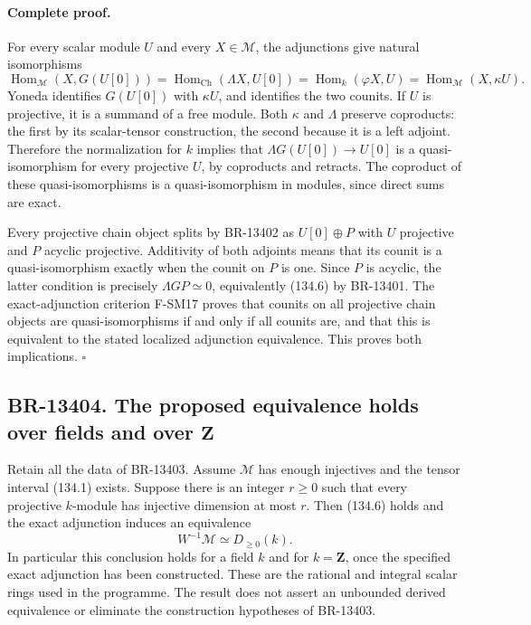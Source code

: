 \documentclass[11pt,a4paper]{article}
\theoremstyle{definition}\newtheorem{definition}[theorem]{Definition}
\theoremstyle{remark}\newtheorem{remark}[theorem]{Remark}
\begin{document}
\paragraph{Complete proof.}
For every scalar module \(U\) and every \(X\in\mathcal M\),
the adjunctions give natural isomorphisms
\[
 \operatorname{Hom}_{\mathcal M}(X,G(U[0]))
 =\operatorname{Hom}_{\mathrm{Ch}}(\Lambda X,U[0])
 =\operatorname{Hom}_k(\varphi X,U)
 =\operatorname{Hom}_{\mathcal M}(X,\kappa U).
\]
Yoneda identifies \(G(U[0])\) with \(\kappa U\), and identifies
the two counits.  If \(U\) is projective, it is a summand of a free
module.  Both \(\kappa\) and \(\Lambda\) preserve coproducts:
the first by its scalar-tensor construction, the second because it is
a left adjoint.  Therefore the normalization for \(k\) implies that
\(\Lambda G(U[0])\to U[0]\) is a quasi-isomorphism for every
projective \(U\), by coproducts and retracts.  The coproduct of these
quasi-isomorphisms is a quasi-isomorphism in modules, since direct
sums are exact.

Every projective chain object splits by BR-13402 as \(U[0]\oplus P\)
with \(U\) projective and \(P\) acyclic projective.  Additivity of
both adjoints means that its counit is a quasi-isomorphism exactly when
the counit on \(P\) is one.  Since \(P\) is acyclic, the latter
condition is precisely \(\Lambda GP\simeq0\), equivalently (134.6)
by BR-13401.  The exact-adjunction criterion F-SM17 proves that counits
on all projective chain objects are quasi-isomorphisms if and only if
all counits are, and that this is equivalent to the stated localized
adjunction equivalence.  This proves both implications. \(\square\)

\subsection{BR-13404. The proposed equivalence holds over fields and over \(\mathbf Z\)}
Retain all the data of BR-13403.  Assume \(\mathcal M\) has enough
injectives and the tensor interval (134.1) exists.  Suppose there is
an integer \(r\geq0\) such that every projective \(k\)-module has
injective dimension at most \(r\).  Then (134.6) holds and the exact
adjunction induces an equivalence
\[
 W^{-1}\mathcal M\simeq D_{\geq0}(k).
 \tag{134.7}
\]
In particular this conclusion holds for a field \(k\) and for
\(k=\mathbf Z\), once the specified exact adjunction has been
constructed.  These are the rational and integral scalar rings used
in the programme.  The result does not assert an unbounded derived
equivalence or eliminate the construction hypotheses of BR-13403.
\end{document}
